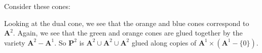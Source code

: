 \documentclass [11 pt, oneside, margin = 1 in] {article}
\begin{document}
Consider these cones:
\begin{center}
\end{center}
Looking at the dual cone, we see that the orange and blue cones correspond to $\mathbf{A}^2$.  Again, we see that the green and orange cones are glued together by the variety $\mathbf{A}^2 - \mathbf{A}^1$. So $\mathbf{P}^2$ is $\mathbf{A}^2\cup \mathbf{A}^2\cup \mathbf{A}^2$ glued along copies of $\mathbf{A}^1\times (\mathbf{A}^1-\{0\})$.
\end{document}
